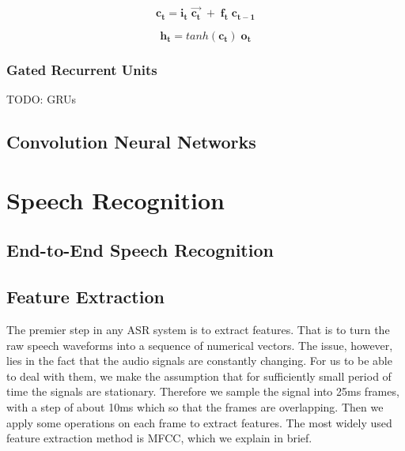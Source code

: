 



\begin{equation}
\label{eq:11}
\mathbf{c_t} = \mathbf{i_t } \; \mathbf{\vec{c_t}} \; + \;  \mathbf{f_t} \; \mathbf{c_{t-1}}
\end{equation}

\begin{equation}
\label{eq:12}
\mathbf{h_t} = tanh(\mathbf{c_t}) \; \mathbf{o_t}
\end{equation}




\subsubsection{Gated Recurrent Units}
\label{bg:subsub6}
TODO: \ac{GRUs}


\subsection{Convolution Neural Networks} 
\label{bg:sub3}



\section{Speech Recognition} \label{bg:s3}

\subsection{End-to-End Speech Recognition} 
\label{bg:sub4}

\subsection{Feature Extraction} 
\label{bg:sub5}

The premier step in any \ac{ASR} system is to extract features. That is to turn the raw speech waveforms into a sequence of numerical vectors. The issue, however, lies in the fact that the audio signals are constantly changing. For us to be able to deal with them, we make the assumption that for sufficiently small period of time the signals are stationary. Therefore we sample the signal into 25ms frames, with a step of about 10ms which so that the frames are overlapping. Then we apply some operations on each frame to extract features. The most widely used feature extraction method is \ac{MFCC}, which we explain in brief.

